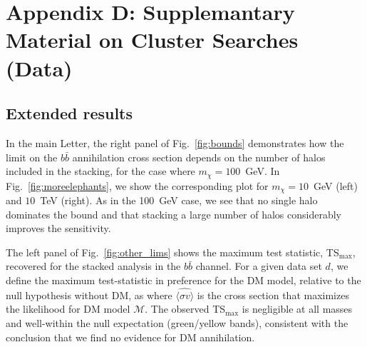 \chapter{Appendix D: Supplemantary Material on Cluster Searches (Data)}


\section{Extended results}
\label{sec:extended}

In the main Letter, the right panel of Fig.~\ref{fig:bounds}  demonstrates how the limit on the  $b\bar b$ annihilation cross section  depends on the number of halos included in the stacking, for the case where  $m_\chi = 100$~GeV. In Fig.~\ref{fig:moreelephants}, we show the corresponding plot for $m_\chi = 10$~GeV (left) and $10$~TeV (right).  As in the 100~GeV case, we see that no single halo dominates the bound and that stacking a large number of halos considerably improves the sensitivity.

The left panel of Fig.~\ref{fig:other_lims} shows the maximum test statistic, TS$_\text{max}$, recovered for the stacked analysis in the $b\bar{b}$ channel.  For a given data set $d$, we define the maximum test-statistic in preference for the DM model, relative to the null hypothesis without DM, as 
where $\widehat{\langle\sigma v\rangle}$ is the cross section that maximizes the likelihood for DM model $\mathcal{M}$.  The observed TS$_\text{max}$ is negligible at all masses and well-within the null expectation (green/yellow bands), consistent with the conclusion that we find no evidence for DM annihilation.  \vspace{0.1in}

